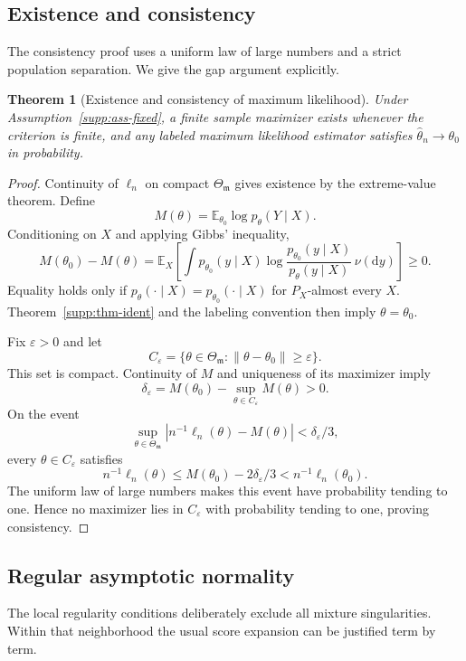 \documentclass[a4paper,fleqn]{cas-sc}
\newtheorem{theorem}{Theorem}[section]
\newcommand{\E}{\mathbb E}
\newcommand{\model}{\mathfrak m}
\numberwithin{equation}{section}
\begin{document}
\subsection{Existence and consistency}

The consistency proof uses a uniform law of large numbers and a strict population separation. We give the gap argument explicitly.

\begin{theorem}[Existence and consistency of maximum likelihood]
\label{supp:thm-consistency}
Under Assumption~\ref{supp:ass-fixed}, a finite sample maximizer exists whenever the criterion is finite, and any labeled maximum likelihood estimator satisfies $\widehat\theta_n\to\theta_0$ in probability.
\end{theorem}

\begin{proof}
Continuity of $\ell_n$ on compact $\Theta_{\model}$ gives existence by the extreme-value theorem. Define
\[
 M(\theta)=\E_{\theta_0}\log p_\theta(Y\mid X).
\]
Conditioning on $X$ and applying Gibbs' inequality,
\[
 M(\theta_0)-M(\theta)
 =\E_X\!\left[
 \int p_{\theta_0}(y\mid X)
 \log\frac{p_{\theta_0}(y\mid X)}{p_\theta(y\mid X)}
 \,\nu(\mathrm dy)\right]\geq0.
\]
Equality holds only if $p_\theta(\cdot\mid X)=p_{\theta_0}(\cdot\mid X)$ for $P_X$-almost every $X$. Theorem~\ref{supp:thm-ident} and the labeling convention then imply $\theta=\theta_0$.

Fix $\varepsilon>0$ and let
\[
 C_\varepsilon=\{\theta\in\Theta_{\model}:\|\theta-\theta_0\|\geq\varepsilon\}.
\]
This set is compact. Continuity of $M$ and uniqueness of its maximizer imply
\[
 \delta_\varepsilon
 =M(\theta_0)-\sup_{\theta\in C_\varepsilon}M(\theta)>0.
\]
On the event
\[
 \sup_{\theta\in\Theta_{\model}}
 |n^{-1}\ell_n(\theta)-M(\theta)|<\delta_\varepsilon/3,
\]
every $\theta\in C_\varepsilon$ satisfies
\[
 n^{-1}\ell_n(\theta)
 \leq M(\theta_0)-2\delta_\varepsilon/3
 <n^{-1}\ell_n(\theta_0).
\]
The uniform law of large numbers makes this event have probability tending to one. Hence no maximizer lies in $C_\varepsilon$ with probability tending to one, proving consistency.
\end{proof}

\subsection{Regular asymptotic normality}

The local regularity conditions deliberately exclude all mixture singularities. Within that neighborhood the usual score expansion can be justified term by term.
\end{document}
